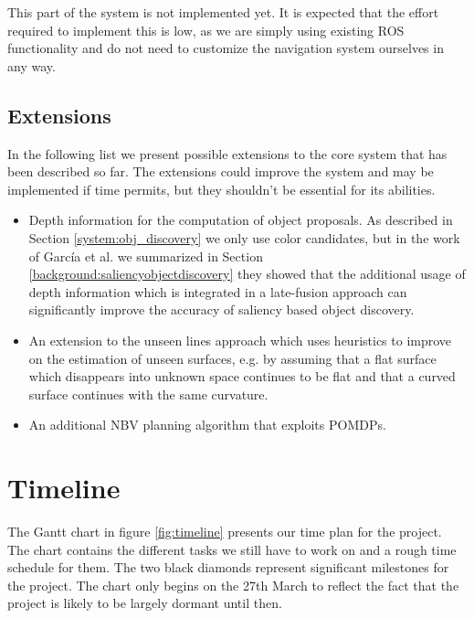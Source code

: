 \documentclass[a4paper,11pt,english]{article}
\begin{document}
This part of the system is not implemented yet. It is expected that the effort required to implement this is low, as we are simply using existing ROS functionality and do not need to customize the navigation system ourselves in any way.

\subsection{Extensions}
\label{system:extensions}
In the following list we present possible extensions to the core system that has been described so far. 
The extensions could improve the system and may be implemented if time permits, but they shouldn't be essential for its abilities.

\begin{itemize}
	\item Depth information for the computation of object proposals.
	As described in Section \ref{system:obj_discovery} we only use color candidates, but in the work of García et al. we summarized in Section \ref{background:saliencyobjectdiscovery} they showed that the additional usage of depth information which is integrated in a late-fusion approach can significantly improve the accuracy of saliency based object discovery.
	\item An extension to the unseen lines approach which uses heuristics to improve on the estimation of unseen surfaces, e.g. by assuming that a flat surface which disappears into unknown space continues to be flat and that a curved surface continues with the same curvature.
	\item An additional NBV planning algorithm that exploits POMDPs.
\end{itemize}

\section{Timeline}
\label{timeline}

The Gantt chart in figure \ref{fig:timeline} presents our time plan for the project.
The chart contains the different tasks we still have to work on and a rough time schedule for them.
The two black diamonds represent significant milestones for the project.
The chart only begins on the 27th March to reflect the fact that the project is likely to be largely dormant until then.
\end{document}
